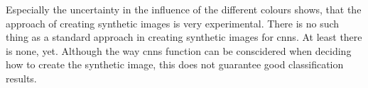 
Especially the uncertainty in the influence of the different colours shows, that the approach of creating synthetic images is very experimental. There is no such thing as a standard approach in creating synthetic images for cnns. At least there is none, yet. Although the way cnns function can be conscidered when deciding how to create the synthetic image, this does not guarantee good classification results.


